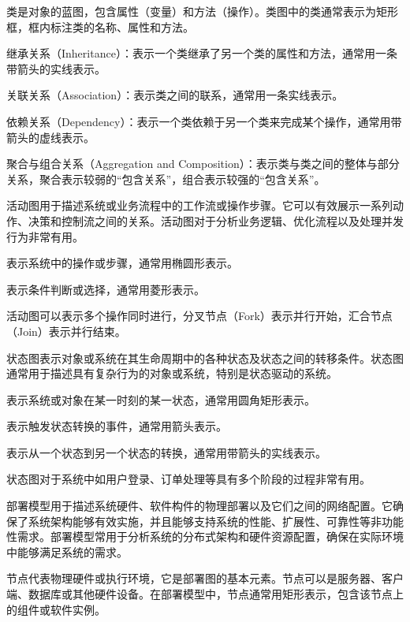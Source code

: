 类是对象的蓝图，包含属性（变量）和方法（操作）。类图中的类通常表示为矩形框，框内标注类的名称、属性和方法。


继承关系（Inheritance）：表示一个类继承了另一个类的属性和方法，通常用一条带箭头的实线表示。

关联关系（Association）：表示类之间的联系，通常用一条实线表示。

依赖关系（Dependency）：表示一个类依赖于另一个类来完成某个操作，通常用带箭头的虚线表示。

聚合与组合关系（Aggregation and Composition）：表示类与类之间的整体与部分关系，聚合表示较弱的``包含关系''，组合表示较强的``包含关系''。

活动图用于描述系统或业务流程中的工作流或操作步骤。它可以有效展示一系列动作、决策和控制流之间的关系。活动图对于分析业务逻辑、优化流程以及处理并发行为非常有用。

表示系统中的操作或步骤，通常用椭圆形表示。

表示条件判断或选择，通常用菱形表示。

活动图可以表示多个操作同时进行，分叉节点（Fork）表示并行开始，汇合节点（Join）表示并行结束。

状态图表示对象或系统在其生命周期中的各种状态及状态之间的转移条件。状态图通常用于描述具有复杂行为的对象或系统，特别是状态驱动的系统。

表示系统或对象在某一时刻的某一状态，通常用圆角矩形表示。

表示触发状态转换的事件，通常用箭头表示。

表示从一个状态到另一个状态的转换，通常用带箭头的实线表示。

状态图对于系统中如用户登录、订单处理等具有多个阶段的过程非常有用。


部署模型用于描述系统硬件、软件构件的物理部署以及它们之间的网络配置。它确保了系统架构能够有效实施，并且能够支持系统的性能、扩展性、可靠性等非功能性需求。部署模型常用于分析系统的分布式架构和硬件资源配置，确保在实际环境中能够满足系统的需求。

节点代表物理硬件或执行环境，它是部署图的基本元素。节点可以是服务器、客户端、数据库或其他硬件设备。在部署模型中，节点通常用矩形表示，包含该节点上的组件或软件实例。

